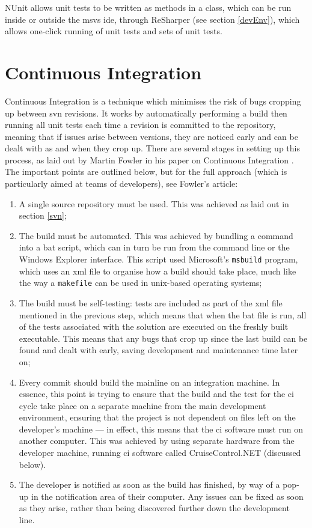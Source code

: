 NUnit allows unit tests to be written as methods in a class, which can be run inside or outside the \gls{msvs} \gls{ide}, through ReSharper (see section \ref{devEnv}), which allows one-click running of unit tests and sets of unit tests.

\section{Continuous Integration}
\label{continuousIntegration}
Continuous Integration is a technique which minimises the risk of bugs cropping up between \gls{svn} revisions.  It works by automatically performing a build then running all unit tests each time a revision is committed to the repository, meaning that if issues arise between versions, they are noticed early and can be dealt with as and when they crop up.  There are several stages in setting up this process, as laid out by Martin Fowler in his paper on Continuous Integration \cite{fowlerCI}.  The important points are outlined below, but for the full approach (which is particularly aimed at teams of developers), see Fowler's article:
\begin{enumerate}
	\item A single source repository must be used.  This was achieved as laid out in section \ref{svn};
	\item The build must be automated.  This was achieved by bundling a command into a \gls{bat} script, which can in turn be run from the command line or the Windows Explorer interface.  This script used Microsoft's \texttt{msbuild} program, which uses an \gls{xml} file to organise how a build should take place, much like the way a \texttt{makefile} can be used in \gls{unix}-based operating systems;
	\item The build must be self-testing: tests are included as part of the \gls{xml} file mentioned in the previous step, which means that when the \gls{bat} file is run, all of the tests associated with the solution are executed on the freshly built executable.  This means that any bugs that crop up since the last build can be found and dealt with early, saving development and maintenance time later on;
	\item Every commit should build the mainline on an integration machine. In essence, this point is trying to ensure that the build and the test for the \gls{ci} cycle take place on a separate machine from the main development environment, ensuring that the project is not dependent on files left on the developer's machine --- in effect, this means that the \gls{ci} software must run on another computer.  This was achieved by using separate hardware from the developer machine, running \gls{ci} software called CruiseControl.NET (discussed below).  
	\item The developer is notified as soon as the build has finished, by way of a pop-up in the notification area of their computer.  Any issues can be fixed as soon as they arise, rather than being discovered further down the development line.
\end{enumerate}

